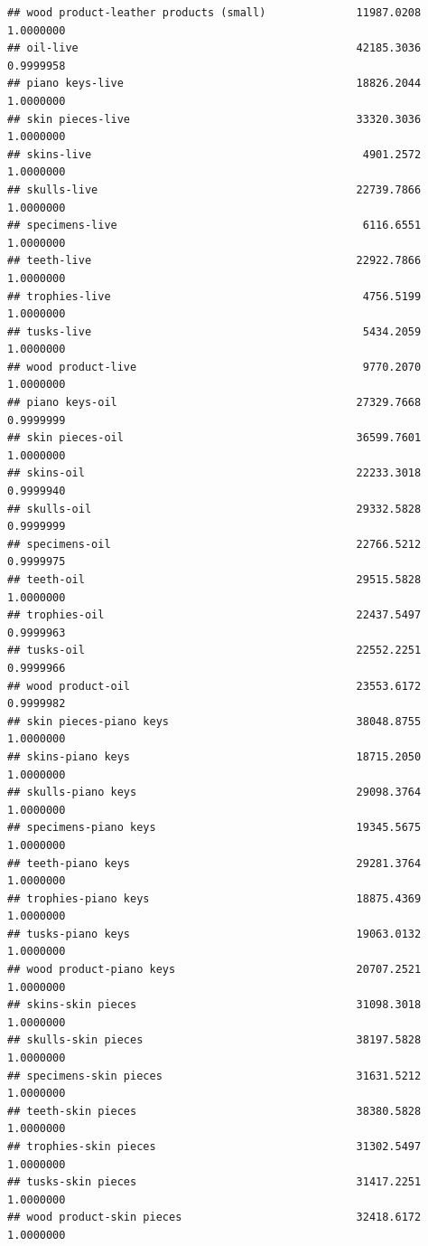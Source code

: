 \documentclass[
  12pt,
]{article}
\begin{document}
\begin{verbatim}
## wood product-leather products (small)              11987.0208 1.0000000
## oil-live                                           42185.3036 0.9999958
## piano keys-live                                    18826.2044 1.0000000
## skin pieces-live                                   33320.3036 1.0000000
## skins-live                                          4901.2572 1.0000000
## skulls-live                                        22739.7866 1.0000000
## specimens-live                                      6116.6551 1.0000000
## teeth-live                                         22922.7866 1.0000000
## trophies-live                                       4756.5199 1.0000000
## tusks-live                                          5434.2059 1.0000000
## wood product-live                                   9770.2070 1.0000000
## piano keys-oil                                     27329.7668 0.9999999
## skin pieces-oil                                    36599.7601 1.0000000
## skins-oil                                          22233.3018 0.9999940
## skulls-oil                                         29332.5828 0.9999999
## specimens-oil                                      22766.5212 0.9999975
## teeth-oil                                          29515.5828 1.0000000
## trophies-oil                                       22437.5497 0.9999963
## tusks-oil                                          22552.2251 0.9999966
## wood product-oil                                   23553.6172 0.9999982
## skin pieces-piano keys                             38048.8755 1.0000000
## skins-piano keys                                   18715.2050 1.0000000
## skulls-piano keys                                  29098.3764 1.0000000
## specimens-piano keys                               19345.5675 1.0000000
## teeth-piano keys                                   29281.3764 1.0000000
## trophies-piano keys                                18875.4369 1.0000000
## tusks-piano keys                                   19063.0132 1.0000000
## wood product-piano keys                            20707.2521 1.0000000
## skins-skin pieces                                  31098.3018 1.0000000
## skulls-skin pieces                                 38197.5828 1.0000000
## specimens-skin pieces                              31631.5212 1.0000000
## teeth-skin pieces                                  38380.5828 1.0000000
## trophies-skin pieces                               31302.5497 1.0000000
## tusks-skin pieces                                  31417.2251 1.0000000
## wood product-skin pieces                           32418.6172 1.0000000

\end{verbatim}
\end{document}
